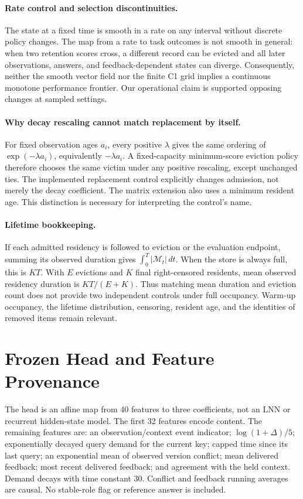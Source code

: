 \paragraph{Rate control and selection discontinuities.}
The state at a fixed time is smooth in a rate on any interval without discrete policy changes. The map from a rate to task outcomes is not smooth in general: when two retention scores cross, a different record can be evicted and all later observations, answers, and feedback-dependent states can diverge. Consequently, neither the smooth vector field nor the finite C1 grid implies a continuous monotone performance frontier. Our operational claim is supported opposing changes at sampled settings.

\paragraph{Why decay rescaling cannot match replacement by itself.}
For fixed observation ages $a_i$, every positive $\lambda$ gives the same ordering of $\exp(-\lambda a_i)$, equivalently $-\lambda a_i$. A fixed-capacity minimum-score eviction policy therefore chooses the same victim under any positive rescaling, except unchanged ties. The implemented replacement control explicitly changes admission, not merely the decay coefficient. The matrix extension also uses a minimum resident age. This distinction is necessary for interpreting the control's name.

\paragraph{Lifetime bookkeeping.}
If each admitted residency is followed to eviction or the evaluation endpoint, summing its observed duration gives $\int_0^T|\mathcal M_t|\,dt$. When the store is always full, this is $KT$. With $E$ evictions and $K$ final right-censored residents, mean observed residency duration is $KT/(E+K)$. Thus matching mean duration and eviction count does not provide two independent controls under full occupancy. Warm-up occupancy, the lifetime distribution, censoring, resident age, and the identities of removed items remain relevant.

\section{Frozen Head and Feature Provenance}\label{app:head}
The head is an affine map from 40 features to three coefficients, not an LNN or recurrent hidden-state model. The first 32 features encode content. The remaining features are: an observation/context event indicator; $\log(1+\Delta)/5$; exponentially decayed query demand for the current key; capped time since its last query; an exponential mean of observed version conflict; mean delivered feedback; most recent delivered feedback; and agreement with the held context. Demand decays with time constant 30. Conflict and feedback running averages are causal. No stable-role flag or reference answer is included.


